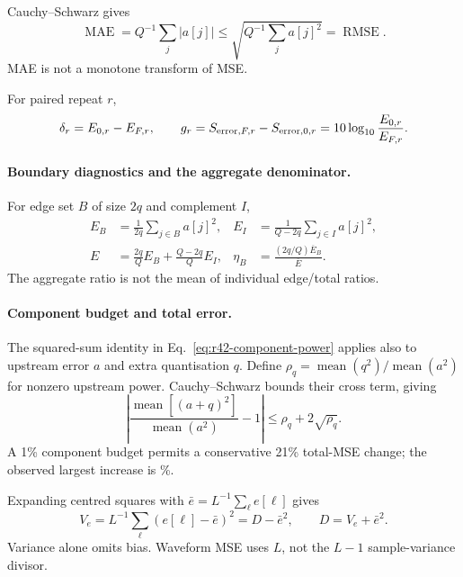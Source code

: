 Cauchy--Schwarz gives
\begin{equation}
 \operatorname{MAE}=Q^{-1}\sum_j|a[j]|\leq
 \sqrt{Q^{-1}\sum_ja[j]^2}=\operatorname{RMSE}.
 \label{eq:r41-mae}
\end{equation}
MAE is not a monotone transform of MSE.

For paired repeat $r$,
\begin{equation}
 \delta_r=E_{0,r}-E_{F,r},\qquad
 g_r=S_{{\rm error},F,r}-S_{{\rm error},0,r}
     =10\log_{10}\frac{E_{0,r}}{E_{F,r}}.
 \label{eq:r23-paired}
\end{equation}

\paragraph{Boundary diagnostics and the aggregate denominator.}
For edge set $B$ of size $2q$ and complement $I$,
\begin{align}
 E_B&=\frac1{2q}\sum_{j\in B}a[j]^2,&
 E_I&=\frac1{Q-2q}\sum_{j\in I}a[j]^2,\nonumber\\
 E&=\frac{2q}{Q}E_B+\frac{Q-2q}{Q}E_I,&
 \eta_B&=\frac{(2q/Q)\overline E_B}{\overline E}.
 \label{eq:r23-boundary-metrics}
\end{align}
The aggregate ratio is not the mean of individual edge/total ratios.

\paragraph{Component budget and total error.}
The squared-sum identity in Eq.~\eqref{eq:r42-component-power} applies
also to upstream error $a$ and extra quantisation $q$. Define
$\rho_q=\operatorname{mean}(q^2)/\operatorname{mean}(a^2)$ for nonzero
upstream power. Cauchy--Schwarz bounds their cross term, giving
\begin{equation}
 \left|\frac{\operatorname{mean}[(a+q)^2]}
                  {\operatorname{mean}(a^2)}-1\right|
 \le \rho_q+2\sqrt{\rho_q}.
 \label{eq:r31-total-bound}
\end{equation}
A 1\% component budget permits a conservative 21\% total-MSE change;
the observed largest increase is \QMaxTotalPercent\%.

Expanding centred squares with $\bar e=L^{-1}\sum_\ell e[\ell]$ gives
\begin{equation}
 V_e=L^{-1}\sum_\ell(e[\ell]-\bar e)^2=D-\bar e^2,
 \qquad D=V_e+\bar e^2.
 \label{eq:r41-bias}
\end{equation}
Variance alone omits bias. Waveform MSE uses $L$, not the $L-1$ sample-variance divisor.

